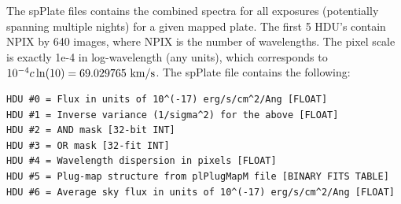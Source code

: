 \documentclass[12pt,preprint]{aastex}
\newcommand{\kms}{{\rm ~km/s}}
\begin{document}
The spPlate files contains the combined spectra for all exposures
(potentially spanning multiple nights) for a given mapped plate.
The first 5 HDU's contain NPIX by 640 images, where NPIX is the number
of wavelengths. The pixel scale is exactly 1e-4 in log-wavelength
(any units), which corresponds to $10^{-4} c \ln(10) = 69.029765 \kms$.
The spPlate file contains the following:
\begin{verbatim}
HDU #0 = Flux in units of 10^(-17) erg/s/cm^2/Ang [FLOAT]
HDU #1 = Inverse variance (1/sigma^2) for the above [FLOAT]
HDU #2 = AND mask [32-bit INT]
HDU #3 = OR mask [32-fit INT]
HDU #4 = Wavelength dispersion in pixels [FLOAT]
HDU #5 = Plug-map structure from plPlugMapM file [BINARY FITS TABLE]
HDU #6 = Average sky flux in units of 10^(-17) erg/s/cm^2/Ang [FLOAT]
\end{verbatim}
\end{document}
